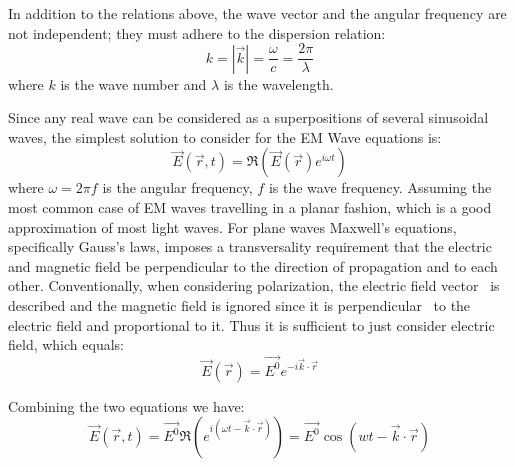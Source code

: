 In addition to the relations above, the wave vector and the angular frequency are not independent; they must adhere to the dispersion relation:
\begin{equation}
k = |\vec{k}| = \frac{\omega}{c} = \frac{2\pi}{\lambda}
\end{equation}
where 
	$k$ is the wave number and $\lambda$ is the wavelength.

Since any real wave can be considered as a superpositions of several sinusoidal waves, the simplest solution to consider for the EM Wave equations is:
\begin{equation}
\vec{E}(\vec{r},t)= \Re \left( \vec{E}(\vec{r}) e^{i \omega t} \right)
\end{equation}
where
	$\omega = 2 \pi f$ is the angular frequency,
	$f$ is the wave frequency.
Assuming the most common case of EM waves travelling in a planar fashion, which is a good approximation of most light waves. 
For plane waves Maxwell's equations, specifically Gauss's laws, imposes a transversality requirement that the electric and magnetic field be perpendicular to the direction of propagation and to each other. 
Conventionally, when considering polarization, the electric field vector  is described and the magnetic field is ignored since it is perpendicular  to the electric field and proportional to it. 
Thus it is sufficient to just consider electric field, which equals:
\begin{equation}
\vec{E}(\vec{r}) = \vec{E^0} e^{-i \vec{k} \cdot \vec{r}} %
\end{equation}

Combining the two equations we have:
\begin{equation}
\vec{E}(\vec{r},t) 
	= \vec{E^0} \Re \left( e^{i (\omega t - \vec{k} \cdot \vec{r})} \right)
	= \vec{E^0} \cos(wt - \vec{k} \cdot \vec{r}) %
\end{equation}

